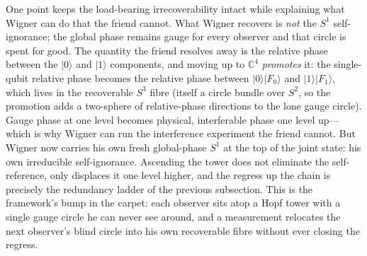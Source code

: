 One point keeps the load-bearing irrecoverability intact while explaining what
Wigner can do that the friend cannot. What Wigner recovers is \emph{not} the
$S^{1}$ self-ignorance; the global phase remains gauge for every observer and that
circle is spent for good. The quantity the friend resolves away is the relative
phase between the $\lvert 0\rangle$ and $\lvert 1\rangle$ components, and moving up
to $\mathbb{C}^{4}$ \emph{promotes} it: the single-qubit relative phase becomes the
relative phase between $\lvert 0\rangle\lvert F_{0}\rangle$ and
$\lvert 1\rangle\lvert F_{1}\rangle$, which lives in the recoverable $S^{3}$ fibre
(itself a circle bundle over $S^{2}$, so the promotion adds a two-sphere of
relative-phase directions to the lone gauge circle). Gauge phase at one level
becomes physical, interferable phase one level up---which is why Wigner can run
the interference experiment the friend cannot. But Wigner now carries his own
fresh global-phase $S^{1}$ at the top of the joint state: his own irreducible
self-ignorance. Ascending the tower does not eliminate the self-reference, only
displaces it one level higher, and the regress up the chain is precisely the
redundancy ladder of the previous subsection. This is the framework's bump in the
carpet: each observer sits atop a Hopf tower with a single gauge circle he can
never see around, and a measurement relocates the next observer's blind circle
into his own recoverable fibre without ever closing the regress.

